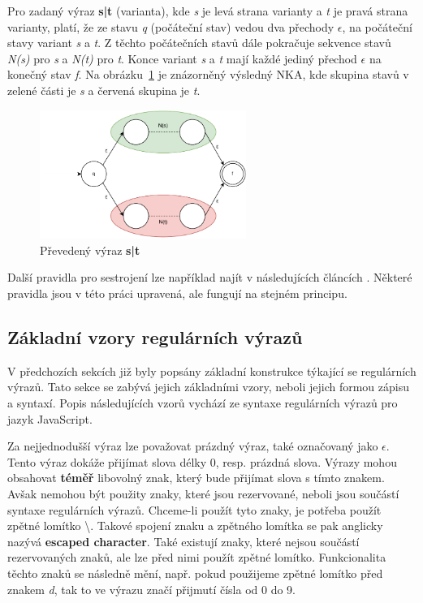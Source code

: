 Pro zadaný výraz \textbf{s|t} (varianta), kde \textit{s} je levá strana varianty a \textit{t} je pravá strana varianty, platí, že ze stavu \textit{q} (počáteční stav) vedou dva přechody
\textit{$\epsilon$}, na počáteční stavy variant \textit{s} a \textit{t}. 
Z těchto počátečních stavů dále pokračuje sekvence stavů \textit{N(s)} pro \textit{s} a \textit{N(t)} pro \textit{t}.
Konce variant \textit{s} a \textit{t} mají každé jediný přechod \textit{$\epsilon$} na konečný stav \textit{f}.
Na obrázku~\ref{fig:NFAunion} je znázorněný výsledný NKA, kde skupina stavů v zelené části je \textit{s} a červená skupina je \textit{t}.
\begin{figure}[!h]
	\centering
	\includegraphics[width=0.6\textwidth]{Figures/NFA_union.pdf}
	\caption{Převedený výraz \textbf{s|t}}
	\label{fig:NFAunion}
\end{figure}

Další pravidla pro sestrojení lze například najít v následujících článcích \cite{Thompson1,Thompson2}.
Některé pravidla jsou v této práci upravená, ale fungují na stejném principu.

\newpage

\subsection*{Základní vzory regulárních výrazů}
V předchozích sekcích již byly popsány základní konstrukce týkající se regulárních výrazů.
Tato sekce se zabývá jejich základními vzory, neboli jejich formou zápisu a syntaxí.
Popis následujících vzorů vychází ze syntaxe regulárních výrazů pro jazyk JavaScript.

Za nejjednodušší výraz lze považovat prázdný výraz, také označovaný jako $\epsilon$. 
Tento výraz dokáže přijímat slova délky 0, resp. prázdná slova.
Výrazy mohou obsahovat \textbf{téměř} libovolný znak, který bude přijímat slova s tímto znakem. 
Avšak nemohou být použity znaky, které jsou rezervované, neboli jsou součástí syntaxe regulárních výrazů.
Chceme-li použít tyto znaky, je potřeba použít zpětné lomítko \textbackslash. 
Takové spojení znaku a zpětného lomítka se pak anglicky nazývá \textbf{escaped character}.
Také existují znaky, které nejsou součástí rezervovaných znaků, ale lze před nimi použít zpětné lomítko.
Funkcionalita těchto znaků se následně mění, např. pokud použijeme zpětné lomítko před znakem \textit{d}, tak to ve výrazu značí přijmutí čísla od 0 do 9.


